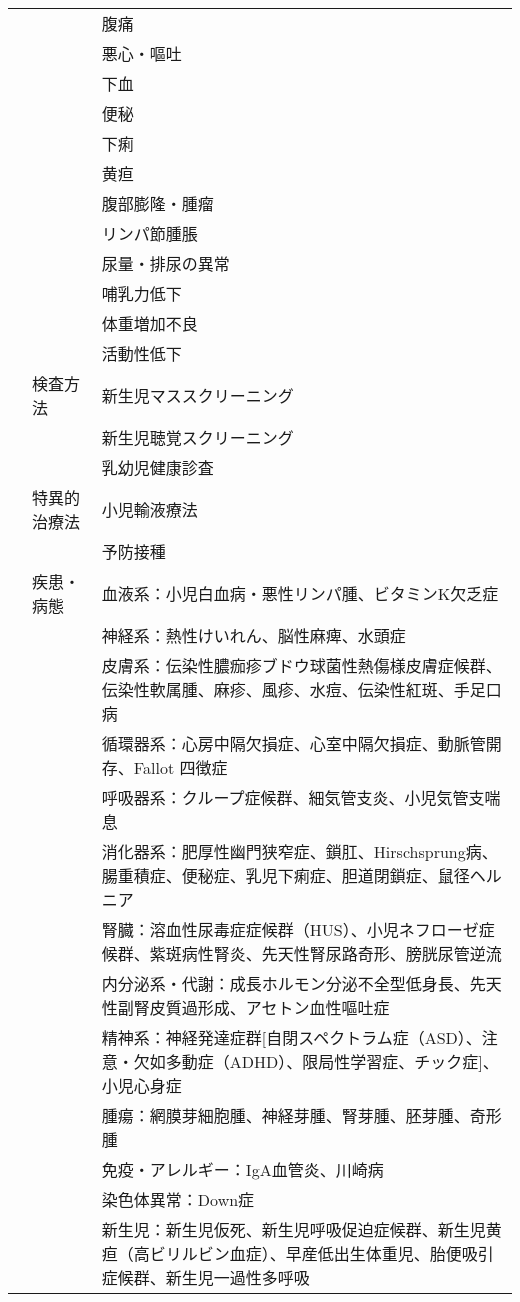 \begin{xltabular}{\linewidth}{XXX}
 &  & 腹痛 \\
 &  & 悪心・嘔吐 \\
 &  & 下血 \\
 &  & 便秘 \\
 &  & 下痢 \\
 &  & 黄疸 \\
 &  & 腹部膨隆・腫瘤 \\
 &  & リンパ節腫脹 \\
 &  & 尿量・排尿の異常 \\
 &  & 哺乳力低下 \\
 &  & 体重増加不良 \\
 &  & 活動性低下 \\
 & 検査方法 & 新生児マススクリーニング \\
 &  & 新生児聴覚スクリーニング \\
 &  & 乳幼児健康診査 \\
 & 特異的治療法 & 小児輸液療法 \\
 &  & 予防接種 \\
 & 疾患・病態 & 血液系：小児白血病・悪性リンパ腫、ビタミンK欠乏症 \\
 &  & 神経系：熱性けいれん、脳性麻痺、水頭症 \\
 &  & 皮膚系：伝染性膿痂疹ブドウ球菌性熱傷様皮膚症候群、伝染性軟属腫、麻疹、風疹、水痘、伝染性紅斑、手足口病 \\
 &  & 循環器系：心房中隔欠損症、心室中隔欠損症、動脈管開存、Fallot 四徴症 \\
 &  & 呼吸器系：クループ症候群、細気管支炎、小児気管支喘息 \\
 &  & 消化器系：肥厚性幽門狭窄症、鎖肛、Hirschsprung病、腸重積症、便秘症、乳児下痢症、胆道閉鎖症、鼠径ヘルニア \\
 &  & 腎臓：溶血性尿毒症症候群（HUS）、小児ネフローゼ症候群、紫斑病性腎炎、先天性腎尿路奇形、膀胱尿管逆流 \\
 &  & 内分泌系・代謝：成長ホルモン分泌不全型低身長、先天性副腎皮質過形成、アセトン血性嘔吐症 \\
 &  & 精神系：神経発達症群[自閉スペクトラム症（ASD）、注意・欠如多動症（ADHD）、限局性学習症、チック症]、小児心身症 \\
 &  & 腫瘍：網膜芽細胞腫、神経芽腫、腎芽腫、胚芽腫、奇形腫 \\
 &  & 免疫・アレルギー：IgA血管炎、川崎病 \\
 &  & 染色体異常：Down症 \\
 &  & 新生児：新生児仮死、新生児呼吸促迫症候群、新生児黄疸（高ビリルビン血症）、早産低出生体重児、胎便吸引症候群、新生児一過性多呼吸 \\

\end{xltabular}
